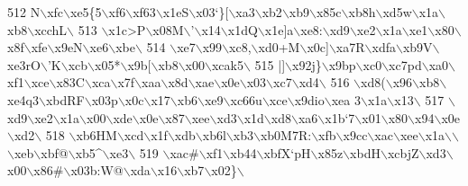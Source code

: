 \begin{DoxyCode}
{512 \textcolor{stringliteral}{N\(\backslash\)xfc\(\backslash\)xe5\{5\(\backslash\)xf6\(\backslash\)xf63\(\backslash\)x1eS\(\backslash\)x03`\}[\(\backslash\)xa3\(\backslash\)xb2\(\backslash\)xb9\(\backslash\)x85c\(\backslash\)xb8h\(\backslash\)xd5w\(\backslash\)x1a\(\backslash\)xb8\(\backslash\)xcchL\(\backslash\)}
513 \textcolor{stringliteral}{\(\backslash\)x1c>P\(\backslash\)x08M\(\backslash\)'\(\backslash\)x14\(\backslash\)x1dQ\(\backslash\)x1e]a\(\backslash\)xe8:\(\backslash\)xd9\(\backslash\)xe2\(\backslash\)x1a\(\backslash\)xe1\(\backslash\)x80\(\backslash\)x8f\(\backslash\)xfe\(\backslash\)x9eN\(\backslash\)xe6\(\backslash\)xbe\(\backslash\)}
514 \textcolor{stringliteral}{\(\backslash\)xe7\(\backslash\)x99\(\backslash\)xc8,\(\backslash\)xd0+M\(\backslash\)x0c]\(\backslash\)xa7R\(\backslash\)xdfa\(\backslash\)xb9V\(\backslash\)xe3rO\(\backslash\)'K\(\backslash\)xcb\(\backslash\)x05*\(\backslash\)x9b[\(\backslash\)xb8\(\backslash\)x00\(\backslash\)xcak5\(\backslash\)}
515 \textcolor{stringliteral}{|]\(\backslash\)x92j\}\(\backslash\)x9bp\(\backslash\)xc0\(\backslash\)xc7pd\(\backslash\)xa0\(\backslash\)xf1\(\backslash\)xce\(\backslash\)x83C\(\backslash\)xca\(\backslash\)x7f\(\backslash\)xaa\(\backslash\)x8d\(\backslash\)xae\(\backslash\)x0e\(\backslash\)x03\(\backslash\)xc7\(\backslash\)xd4\(\backslash\)}
516 \textcolor{stringliteral}{\(\backslash\)xd8(\(\backslash\)x96\(\backslash\)xb8\(\backslash\)xe4q3\(\backslash\)xbdRF\(\backslash\)x03p\(\backslash\)x0c\(\backslash\)x17\(\backslash\)xb6\(\backslash\)xe9\(\backslash\)xc66u\(\backslash\)xce\(\backslash\)x9dio\(\backslash\)xea 3\(\backslash\)x1a\(\backslash\)x13\(\backslash\)}
517 \textcolor{stringliteral}{\(\backslash\)xd9\(\backslash\)xe2\(\backslash\)x1a\(\backslash\)x00\(\backslash\)xde\(\backslash\)x0e\(\backslash\)x87\(\backslash\)xee\(\backslash\)xd3\(\backslash\)x1d\(\backslash\)xd8\(\backslash\)xa6\(\backslash\)x1b`7\(\backslash\)x01\(\backslash\)x80\(\backslash\)x94\(\backslash\)x0e\(\backslash\)xd2\(\backslash\)}
518 \textcolor{stringliteral}{\(\backslash\)xb6HM\(\backslash\)xcd\(\backslash\)x1f\(\backslash\)xdb\(\backslash\)xb6l\(\backslash\)xb3\(\backslash\)xb0M7R:\(\backslash\)xfb\(\backslash\)x9cc\(\backslash\)xac\(\backslash\)xee\(\backslash\)x1a\(\backslash\)\(\backslash\)\(\backslash\)xeb\(\backslash\)xbf@\(\backslash\)xb5^\(\backslash\)xe3\(\backslash\)}
519 \textcolor{stringliteral}{\(\backslash\)xac#\(\backslash\)xf1\(\backslash\)xb44\(\backslash\)xbfX`pH\(\backslash\)x85z\(\backslash\)xbdH\(\backslash\)xcbjZ\(\backslash\)xd3\(\backslash\)x00\(\backslash\)x86#\(\backslash\)x03b:W@\(\backslash\)xda\(\backslash\)x16\(\backslash\)xb7\(\backslash\)x02\}\(\backslash\)}
}
\end{DoxyCode}
